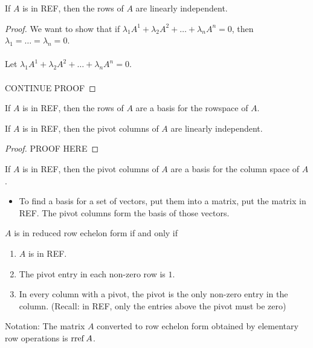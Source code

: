 \documentclass[letterpaper,12pt]{article}
\begin{document}
\begin{theorem}
If $A$ is in REF, then the rows of $A$ are linearly independent.
\end{theorem}
\begin{proof}
We want to show that if $\lambda_1 A^1 + \lambda_2 A^2 + \dots + \lambda_n A^n = 0$, then $\lambda_1 = \dots = \lambda_n = 0$.
\\ \\ Let $\lambda_1 A^1 + \lambda_2 A^2 + \dots + \lambda_n A^n = 0$.
\\ \\ CONTINUE PROOF
\end{proof}
\begin{corollary}
If $A$ is in REF, then the rows of $A$ are a basis for the rowspace of $A$.
\end{corollary}

\begin{theorem}
If $A$ is in REF, then the pivot columns of $A$ are linearly independent.
\end{theorem}
\begin{proof}
PROOF HERE
\end{proof}
\begin{corollary}
If $A$ is in REF, then the pivot columns of $A$ are a basis for the column space of $A$.
\begin{itemize}
    \item To find a basis for a set of vectors, put them into a matrix, put the matrix in REF. The pivot columns form the basis of those vectors.
\end{itemize}
\end{corollary}


\begin{definition}
$A$ is in reduced row echelon form if and only if
\begin{enumerate}
    \item $A$ is in REF.
    \item The pivot entry in each non-zero row is $1$.
    \item In every column with a pivot, the pivot is the only non-zero entry in the column. (Recall: in REF, only the entries above the pivot must be zero)
\end{enumerate}
Notation: The matrix $A$ converted to row echelon form obtained by elementary row operations is $\operatorname{rref}{A}$.
\end{definition}
\end{document}
